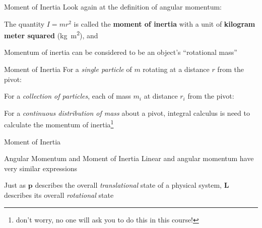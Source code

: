\documentclass[12pt,compress,aspectratio=169]{beamer}
\begin{document}
\begin{frame}{Moment of Inertia}
  Look again at the definition of angular momentum:
    
    
  The quantity $I=mr^2$ is called the \textbf{moment of inertia} with a unit of
  \textbf{kilogram meter squared} (\si{\kilo\gram\metre\squared}), and 


  Momentum of inertia can be considered to be an object's ``rotational mass''

\end{frame}



\begin{frame}{Moment of Inertia}
  For a \emph{single particle} of $m$ rotating at a distance $r$ from the pivot:
  

  For a \emph{collection of particles}, each of mass $m_i$ at distance $r_i$
  from the pivot:


  For a \emph{continuous distribution of mass} about a pivot, integral calculus
  is need to calculate the momentum of inertia\footnote{don't worry, no one
    will ask you to do this in this course!}

\end{frame}



\begin{frame}{Moment of Inertia}
  \centering
\end{frame}



\begin{frame}{Angular Momentum and Moment of Inertia}
  Linear and angular momentum have very similar expressions
    
  
  Just as $\bm{p}$ describes the overall \emph{translational} state of a
  physical system, $\bm{L}$ describes its overall \emph{rotational} state
\end{frame}
\end{document}
